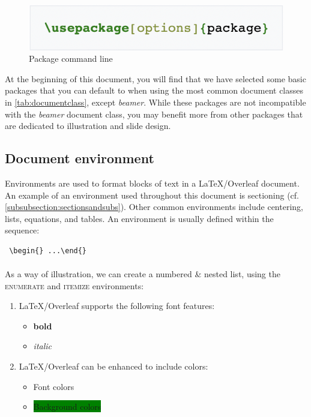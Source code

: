 \documentclass{article} %
\begin{document}
\begin{center}
    \begin{figure}[h]
        \includegraphics[scale=0.7,]{usepackage.png}
            \caption{Package command line}
        \label{fig:usepackage}
    \end{figure}
\end{center}

At the beginning of this document, you will find that we have selected some basic packages that you can default to when using the most common document classes in \cref{tab:documentclass}, except \textit{beamer}. While these packages are not incompatible with the \textit{beamer} document class, you may benefit more from other packages that are dedicated to illustration and slide design.

\subsection{Document environment}
\label{subsection:environment}
Environments are used to format blocks of text in a \LaTeX{}/Overleaf document. An example of an environment used throughout this document is sectioning (cf. \cref{subsubsection:sectionsandsubs}). Other common environments include centering, lists, equations, and tables. An environment is usually defined within the sequence: \begin{verbatim} \begin{} ...\end{} \end{verbatim}

\paragraph{}
\noindent As a way of illustration, we can create a numbered \& nested list, using the \textsc{enumerate} and \textsc{itemize} environments:

\begin{enumerate}
    \item \LaTeX{}/Overleaf supports the following font features:
        \begin{itemize}
            \item \textbf{bold}
            \item \textit{italic}
        \end{itemize}
    \item \LaTeX{}/Overleaf can be enhanced to include colors:
        \begin{itemize}
            \item {\color{Green} Font colors}
            \item \colorbox{Green}{Background colors}
        \end{itemize}
\end{enumerate}
\end{document}
